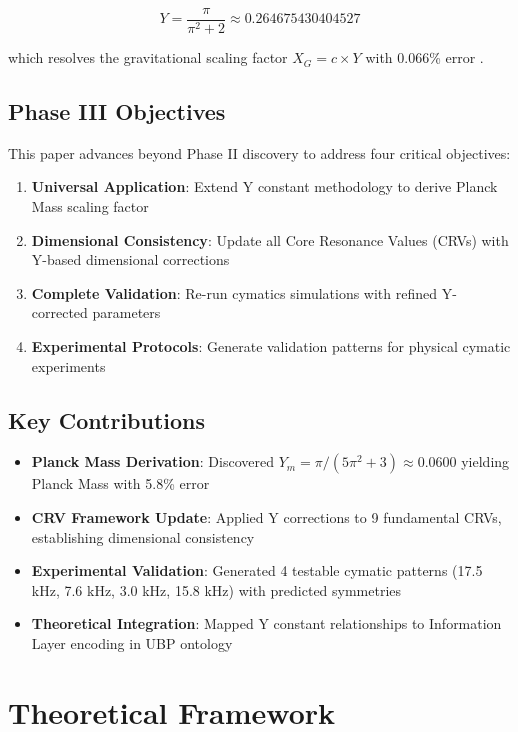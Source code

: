 \documentclass[11pt,a4paper]{article}
\begin{document}
\begin{equation}
Y = \frac{\pi}{\pi^2 + 2} \approx 0.264675430404527
\label{eq:Y_constant}
\end{equation}

which resolves the gravitational scaling factor $X_G = c \times Y$ with 0.066\% error \cite{phase_ii_report}.

\subsection{Phase III Objectives}

This paper advances beyond Phase II discovery to address four critical objectives:

\begin{enumerate}
    \item \textbf{Universal Application}: Extend Y constant methodology to derive Planck Mass scaling factor
    \item \textbf{Dimensional Consistency}: Update all Core Resonance Values (CRVs) with Y-based dimensional corrections
    \item \textbf{Complete Validation}: Re-run cymatics simulations with refined Y-corrected parameters
    \item \textbf{Experimental Protocols}: Generate validation patterns for physical cymatic experiments
\end{enumerate}

\subsection{Key Contributions}

\begin{itemize}
    \item \textbf{Planck Mass Derivation}: Discovered $Y_m = \pi/(5\pi^2 + 3) \approx 0.0600$ yielding Planck Mass with 5.8\% error
    \item \textbf{CRV Framework Update}: Applied Y corrections to 9 fundamental CRVs, establishing dimensional consistency
    \item \textbf{Experimental Validation}: Generated 4 testable cymatic patterns (17.5 kHz, 7.6 kHz, 3.0 kHz, 15.8 kHz) with predicted symmetries
    \item \textbf{Theoretical Integration}: Mapped Y constant relationships to Information Layer encoding in UBP ontology
\end{itemize}

\section{Theoretical Framework}
\end{document}

